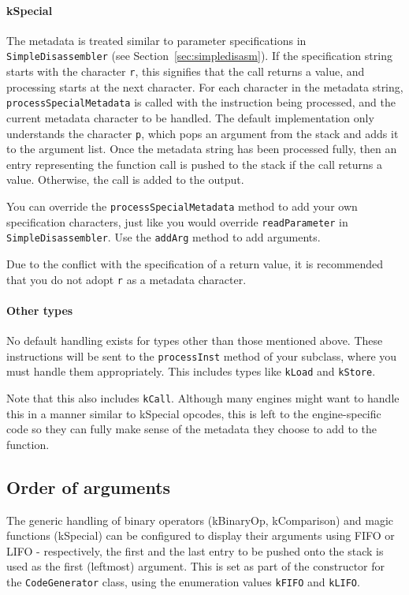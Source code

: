 \paragraph{kSpecial}
The metadata is treated similar to parameter specifications in \verb+SimpleDisassembler+ (see Section~\vref{sec:simpledisasm}). If the specification string starts with the character \verb+r+, this signifies that the call returns a value, and processing starts at the next character.
For each character in the metadata string, \verb+processSpecialMetadata+ is called with the instruction being processed, and the current metadata character to be handled. The default implementation only understands the character \verb+p+, which pops an argument from the stack and adds it to the argument list.
Once the metadata string has been processed fully, then an entry representing the function call is pushed to the stack if the call returns a value. Otherwise, the call is added to the output.

You can override the \verb+processSpecialMetadata+ method to add your own specification characters, just like you would override \verb+readParameter+ in \verb+SimpleDisassembler+. Use the \verb+addArg+ method to add arguments.

Due to the conflict with the specification of a return value, it is recommended that you do not adopt \verb+r+ as a metadata character.

\paragraph{Other types}
No default handling exists for types other than those mentioned above. These instructions will be sent to the \verb+processInst+ method of your subclass, where you must handle them appropriately. This includes types like \verb+kLoad+ and \verb+kStore+.

Note that this also includes \verb+kCall+. Although many engines might want to handle this in a manner similar to kSpecial opcodes, this is left to the engine-specific code so they can fully make sense of the metadata they choose to add to the function.

\subsection{Order of arguments}
\label{sec:argOrder}
The generic handling of binary operators (kBinaryOp, kComparison) and magic functions (kSpecial) can be configured to display their arguments using FIFO or LIFO - respectively, the first and the last entry to be pushed onto the stack is used as the first (leftmost) argument. This is set as part of the constructor for the \verb+CodeGenerator+ class, using the enumeration values \verb+kFIFO+ and \verb+kLIFO+.

